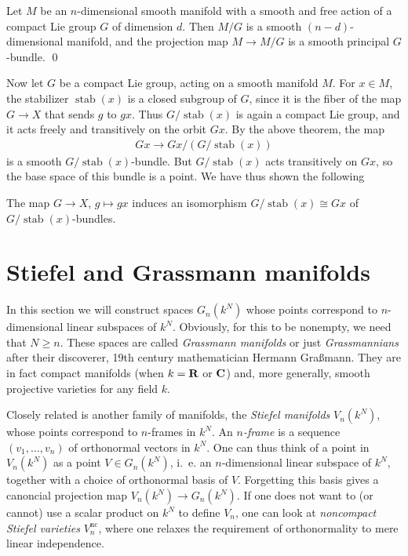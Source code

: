 \documentclass[a4paper,openany]{scrbook}
\DeclareMathOperator{\stab}{stab}
\begin{document}
\begin{thm} \label{thm:freeLiegroupaction}
Let $M$ be an $n$-dimensional smooth manifold with a smooth and free action of a compact Lie group $G$ of dimension $d$. Then $M/G$ is a smooth $(n-d)$-dimensional manifold, and the projection map $M \to M/G$ is a smooth principal $G$-bundle. \qed
\end{thm}

Now let $G$ be a compact Lie group, acting on a smooth manifold $M$. For $x \in M$, the stabilizer $\stab(x)$ is a closed subgroup of $G$, since it is the fiber of the map $G \to X$ that sends $g$ to $gx$. Thus $G/ \stab(x)$ is again a compact Lie group, and it acts freely and transitively on the orbit $Gx$. By the above theorem, the map
\begin{align*}
Gx \to Gx / (G/\stab(x))
\end{align*}
is a smooth $G/\stab(x)$-bundle. But $G/\stab(x)$ acts transitively on $Gx$, so the base space of this bundle is a point. We have thus shown the following
\begin{corollary}
	The map $G \to X$, $g \mapsto gx$ induces an isomorphism $G/\stab(x) \cong Gx$ of $G/\stab(x)$-bundles.
\end{corollary}	


\section{Stiefel and Grassmann manifolds}\label{sec:stiefelgrassmann}

In this section we will construct spaces $G_n(k^N)$ whose points correspond to $n$-dimensional linear subspaces of $k^N$. Obviously, for this to be nonempty, we need that $N \geq n$. These spaces are called \emph{Grassmann manifolds} or just \emph{Grassmannians} after their discoverer, 19th century mathematician Hermann Graßmann. They are in fact compact manifolds (when $k=\mathbf R$ or $\mathbf C$) and, more generally, smooth projective varieties for any field $k$.

Closely related is another family of manifolds, the \emph{Stiefel manifolds} $V_n(k^N)$, whose points correspond to $n$-frames in $k^N$. An \emph{$n$-frame} is a sequence $(v_1,\dots,v_n)$ of orthonormal vectors in $k^N$. One can thus think of a point in $V_n(k^N)$ as a point $V \in G_n(k^N)$, i.~e. an $n$-dimensional linear subspace of $k^N$, together with a choice of orthonormal basis of $V$. Forgetting this basis gives a canoncial projection map $V_n(k^N) \to G_n(k^N)$. If one does not want to (or cannot) use a scalar product on $k^N$ to define $V_n$, one can look at \emph{noncompact Stiefel varieties} $V_n^{\operatorname{nc}}$, where one relaxes the requirement of orthonormality to mere linear independence.
\end{document}
